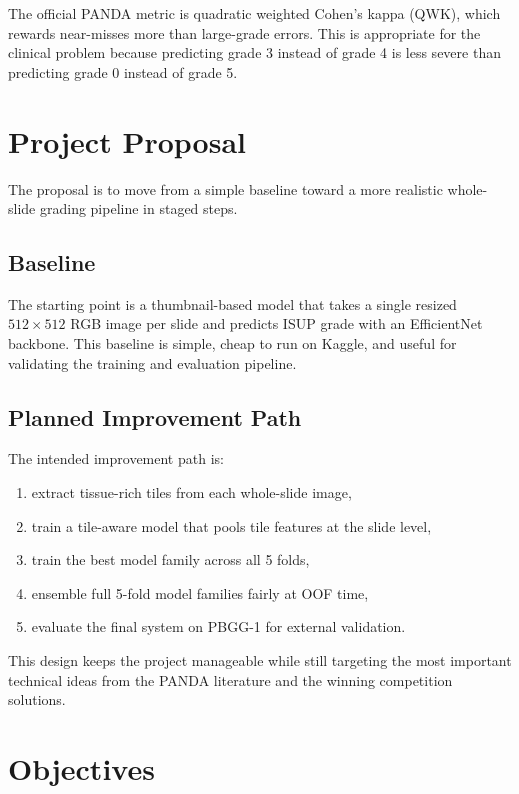 \documentclass[11pt]{article}
\begin{document}
The official PANDA metric is quadratic weighted Cohen's kappa (QWK), which rewards near-misses more than large-grade errors. This is appropriate for the clinical problem because predicting grade 3 instead of grade 4 is less severe than predicting grade 0 instead of grade 5.

\section{Project Proposal}

The proposal is to move from a simple baseline toward a more realistic whole-slide grading pipeline in staged steps.

\subsection{Baseline}

The starting point is a thumbnail-based model that takes a single resized $512 \times 512$ RGB image per slide and predicts ISUP grade with an EfficientNet backbone. This baseline is simple, cheap to run on Kaggle, and useful for validating the training and evaluation pipeline.

\subsection{Planned Improvement Path}

The intended improvement path is:

\begin{enumerate}[leftmargin=*]
    \item extract tissue-rich tiles from each whole-slide image,
    \item train a tile-aware model that pools tile features at the slide level,
    \item train the best model family across all 5 folds,
    \item ensemble full 5-fold model families fairly at OOF time,
    \item evaluate the final system on PBGG-1 for external validation.
\end{enumerate}

This design keeps the project manageable while still targeting the most important technical ideas from the PANDA literature and the winning competition solutions.

\section{Objectives}
\end{document}
